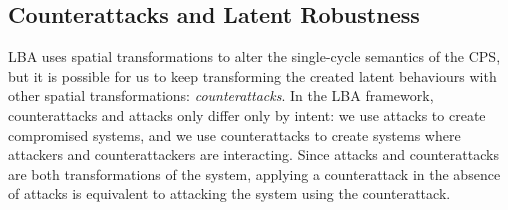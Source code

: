 {\subsection{Counterattacks and Latent Robustness}
\label{sec:CPSRobustness:CounterAttacks}
LBA uses spatial transformations to alter the single-cycle semantics of the CPS, but it is possible for us to keep transforming the created latent behaviours with other spatial transformations: \emph{counterattacks}. In the LBA framework, counterattacks and attacks only differ only by intent: we use attacks to create compromised systems, and we use counterattacks to create systems where attackers and counterattackers are interacting. Since attacks and counterattacks are both transformations of the system, applying a counterattack in the absence of attacks is equivalent to attacking the system using the counterattack. %

}
